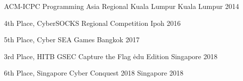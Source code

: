 



\begin{cvhonors}

  \cvhonor
    {}
    {ACM-ICPC Programming Asia Regional Kuala Lumpur} 
    {Kuala Lumpur} 
    {2014} 

  \cvhonor
    {4th Place,} 
    {CyberSOCKS Regional Competition} 
    {Ipoh} 
    {2016} 

  \cvhonor
    {5th Place,} 
    {Cyber SEA Games} 
    {Bangkok} 
    {2017} 

  \cvhonor
    {3rd Place,} 
    {HITB GSEC Capture the Flag \.edu Edition} 
    {Singapore} 
    {2018} 

  \cvhonor
    {6th Place,} 
    {Singapore Cyber Conquest 2018} 
    {Singapore} 
    {2018} 

\end{cvhonors}




